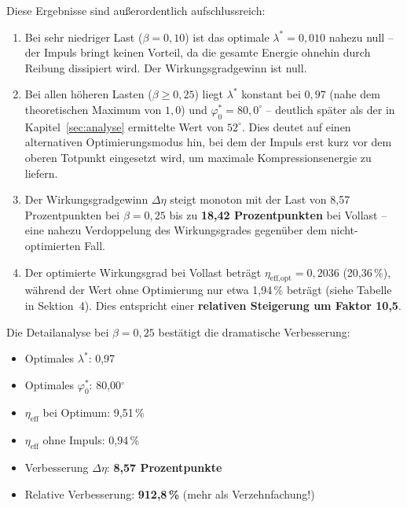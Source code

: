 ﻿\documentclass[a4paper,12pt]{article}
\begin{document}
Diese Ergebnisse sind außerordentlich aufschlussreich:

\begin{enumerate}
  \item Bei sehr niedriger Last ($\beta = 0{,}10$) ist das optimale $\lambda^* = 0{,}010$
    nahezu null -- der Impuls bringt keinen Vorteil, da die gesamte Energie
    ohnehin durch Reibung dissipiert wird. Der Wirkungsgradgewinn ist null.

  \item Bei allen höheren Lasten ($\beta \geq 0{,}25$) liegt $\lambda^*$
    konstant bei $0{,}97$ (nahe dem theoretischen Maximum von $1{,}0$) und
    $\varphi_0^* = 80{,}0^\circ$ -- deutlich später als der in Kapitel~\ref{sec:analyse}
    ermittelte Wert von $52^\circ$. Dies deutet auf einen alternativen
    Optimierungsmodus hin, bei dem der Impuls erst kurz vor dem oberen
    Totpunkt eingesetzt wird, um maximale Kompressionsenergie zu liefern.

  \item Der Wirkungsgradgewinn $\Delta\eta$ steigt monoton mit der Last
    von 8{,}57 Prozentpunkten bei $\beta = 0{,}25$ bis zu \textbf{18{,}42 Prozentpunkten}
    bei Vollast -- eine nahezu Verdoppelung des Wirkungsgrades gegenüber
    dem nicht-optimierten Fall.

  \item Der optimierte Wirkungsgrad bei Vollast beträgt $\eta_\text{eff,opt} = 0{,}2036$
    (20{,}36\,\%), während der Wert ohne Optimierung nur etwa 1{,}94\,\%
    beträgt (siehe Tabelle in Sektion~4). Dies entspricht einer
    \textbf{relativen Steigerung um Faktor 10{,}5}.
\end{enumerate}

Die Detailanalyse bei $\beta = 0{,}25$ bestätigt die dramatische Verbesserung:

\begin{itemize}
  \item Optimales $\lambda^*$: 0{,}97
  \item Optimales $\varphi_0^*$: 80{,}00$^\circ$
  \item $\eta_\text{eff}$ bei Optimum: 9{,}51\,\%
  \item $\eta_\text{eff}$ ohne Impuls: 0{,}94\,\%
  \item Verbesserung $\Delta\eta$: \textbf{8{,}57 Prozentpunkte}
  \item Relative Verbesserung: \textbf{912{,}8\,\%} (mehr als Verzehnfachung!)
\end{itemize}
\end{document}
